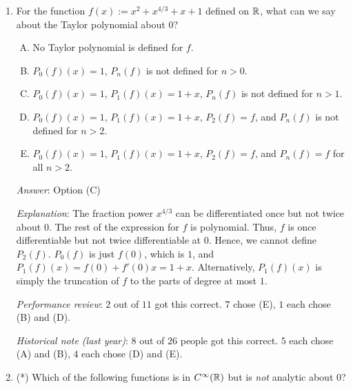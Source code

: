 \documentclass[10pt]{amsart}
\begin{document}
\begin{enumerate}
  {\em Performance review}: $3$ out of $11$ people got this. $3$ chose
  (B), $4$ chose (E), and $1$ left the question blank.

  {\em Historical note (last year)}: $11$ out of $26$ people
  got this correct. $7$ chose (A), $3$ each chose (B) and (E), $1$
  chose (D), and $1$ left the question blank.
\item For the function $f(x) := x^2 + x^{4/3} + x + 1$ defined on
  $\mathbb{R}$, what can we say about the Taylor polynomial about $0$?

  \begin{enumerate}[(A)]
  \item No Taylor polynomial is defined for $f$.
  \item $P_0(f)(x) = 1$, $P_n(f)$ is not defined for $n > 0$.
  \item $P_0(f)(x) = 1$, $P_1(f)(x) = 1 + x$, $P_n(f)$ is not defined
    for $n > 1$.
  \item $P_0(f)(x) = 1$, $P_1(f)(x) = 1 + x$, $P_2(f) = f$, and
    $P_n(f)$ is not defined for $n > 2$.
  \item $P_0(f)(x) = 1$, $P_1(f)(x) = 1 + x$, $P_2(f) = f$, and
    $P_n(f) = f$ for all $n > 2$.
  \end{enumerate}

  {\em Answer}: Option (C)

  {\em Explanation}: The fraction power $x^{4/3}$ can be
  differentiated once but not twice about $0$. The rest of the
  expression for $f$ is polynomial. Thus, $f$ is once differentiable
  but not twice differentiable at $0$. Hence, we cannot define
  $P_2(f)$. $P_0(f)$ is just $f(0)$, which is $1$, and $P_1(f)(x) =
  f(0) + f'(0)x = 1 + x$. Alternatively, $P_1(f)(x)$ is simply the
  truncation of $f$ to the parts of degree at most $1$.

  {\em Performance review}: $2$ out of $11$ got this correct. $7$
  chose (E), $1$ each chose (B) and (D).

  {\em Historical note (last year)}: $8$ out of $26$ people got this
  correct. $5$ each chose (A) and (B), $4$ each chose (D) and (E).
  
\item (*) Which of the following functions is in $C^\infty(\mathbb{R})$ but is
  {\em not} analytic about $0$?


\end{enumerate}
\end{document}
